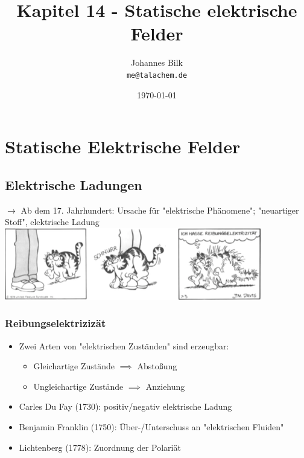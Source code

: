 \documentclass[11pt]{article}
\begin{document}
	\title{Kapitel 14 - Statische elektrische Felder}
		\author
		{Johannes Bilk
			\\
			{\small 	\texttt{me@talachem.de}}
		}
		\date{\today}
	\maketitle
	\tableofcontents
	\setcounter{section}{13} %
	
	\newpage
	
\section{Statische Elektrische Felder}	
	\subsection{ Elektrische Ladungen }	
	
	$\rightarrow$ Ab dem 17. Jahrhundert: Ursache für "elektrische Ph\"{a}nomene"; "neuartiger Stoff", elektrische Ladung\\
\includegraphics{skizzen/14/14_1B0}
		\subsubsection{ Reibungselektriziz\"{a}t }
		
			\begin{itemize}
			\item Zwei Arten von "elektrischen Zust\"{a}nden" sind erzeugbar:
				\begin{itemize}
				\item Gleichartige Zust\"{a}nde $\implies$ Abstoßung
				\item Ungleichartige Zust\"{a}nde $\implies$ Anziehung
			\end{itemize}
			\item Carles Du Fay (1730): positiv/negativ elektrische Ladung
			\item Benjamin Franklin (1750): Über-/Unterschuss an "elektrischen Fluiden"
			\item Lichtenberg (1778): Zuordnung der Polari\"{a}t
			\end{itemize}
			
\end{document}

